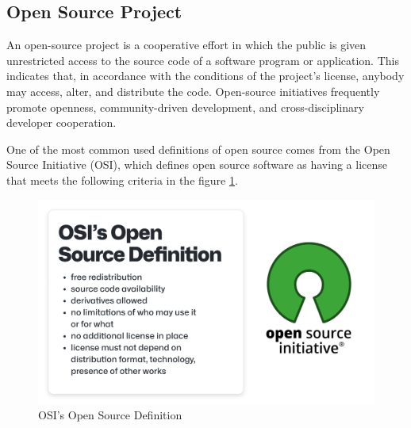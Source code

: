 \subsection{Open Source Project}
An open-source project is a cooperative effort in which the public is given unrestricted access to the source code of a software program or application. This indicates that, in accordance with the conditions of the project's license, anybody may access, alter, and distribute the code. Open-source initiatives frequently promote openness, community-driven development, and cross-disciplinary developer cooperation.

One of the most common used definitions of open source comes from the Open Source Initiative (OSI), which defines open source software as having a license that meets the following criteria in the figure \ref{fig:osidef}.

\begin{figure}[ht]
    \includegraphics[width=12cm]{figs/osiopensourcedef.png}
    \centering
    \caption{OSI's Open Source Definition \citep{HaeussgeDevGuide}}
    \label{fig:osidef}
\end{figure}



